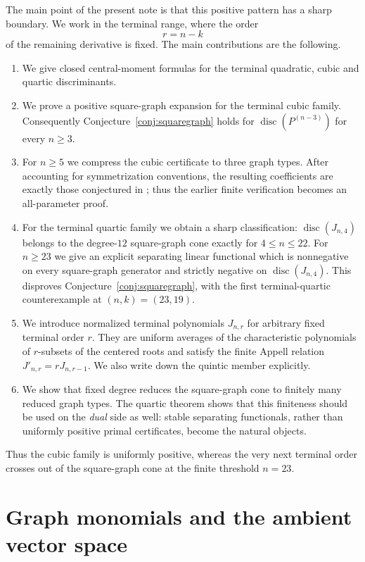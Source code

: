 \documentclass[11pt]{amsart}
\numberwithin{equation}{section}
\newcommand{\disc}{\operatorname{disc}}
\begin{document}
The main point of the present note is that this positive pattern has a sharp
boundary.  We work in the terminal range, where the order
\[
        r=n-k
\]
of the remaining derivative is fixed.  The main contributions are the
following.
\begin{enumerate}[label={\rm(\alph*)}]
\item We give closed central-moment formulas for the terminal quadratic,
cubic and quartic discriminants.
\item We prove a positive square-graph expansion for the terminal cubic
family.  Consequently Conjecture~\ref{conj:squaregraph} holds for
$\disc(P^{(n-3)})$ for every $n\ge3$.
\item For $n\ge5$ we compress the cubic certificate to three graph types.
After accounting for symmetrization conventions, the resulting coefficients
are exactly those conjectured in \cite[Example~3]{AS}; thus the earlier finite
verification becomes an all-parameter proof.
\item For the terminal quartic family we obtain a sharp classification:
$\disc(J_{n,4})$ belongs to the degree-$12$ square-graph cone exactly for
$4\le n\le22$.  For $n\ge23$ we give an explicit separating linear functional
which is nonnegative on every square-graph generator and strictly negative on
$\disc(J_{n,4})$.  This disproves Conjecture~\ref{conj:squaregraph}, with the
first terminal-quartic counterexample at $(n,k)=(23,19)$.
\item We introduce normalized terminal polynomials $J_{n,r}$ for arbitrary
fixed terminal order $r$.  They are uniform averages of the characteristic
polynomials of $r$-subsets of the centered roots and satisfy the finite Appell
relation $J'_{n,r}=rJ_{n,r-1}$.  We also write down the quintic member
explicitly.
\item We show that fixed degree reduces the square-graph cone to finitely many
reduced graph types.  The quartic theorem shows that this finiteness should be
used on the \emph{dual} side as well: stable separating functionals, rather
than uniformly positive primal certificates, become the natural objects.
\end{enumerate}
Thus the cubic family is uniformly positive, whereas the very next terminal
order crosses out of the square-graph cone at the finite threshold $n=23$.

\section{Graph monomials and the ambient vector space}
\end{document}
